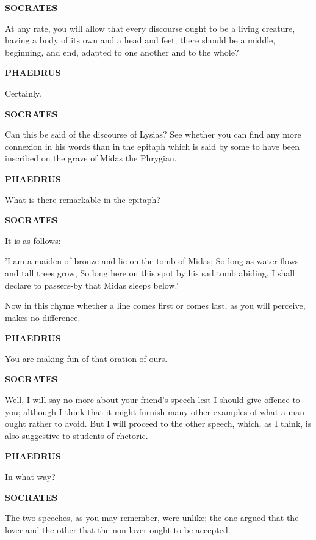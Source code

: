 \documentclass[11pt,letter]{article}
\begin{document}
\par \textbf{SOCRATES}
\par   At any rate, you will allow that every discourse ought to be a living creature, having a body of its own and a head and feet; there should be a middle, beginning, and end, adapted to one another and to the whole?

\par \textbf{PHAEDRUS}
\par   Certainly.

\par \textbf{SOCRATES}
\par   Can this be said of the discourse of Lysias? See whether you can find any more connexion in his words than in the epitaph which is said by some to have been inscribed on the grave of Midas the Phrygian.

\par \textbf{PHAEDRUS}
\par   What is there remarkable in the epitaph?

\par \textbf{SOCRATES}
\par   It is as follows: —

\par  'I am a maiden of bronze and lie on the tomb of Midas; So long as water flows and tall trees grow, So long here on this spot by his sad tomb abiding, I shall declare to passers-by that Midas sleeps below.'

\par  Now in this rhyme whether a line comes first or comes last, as you will perceive, makes no difference.

\par \textbf{PHAEDRUS}
\par   You are making fun of that oration of ours.

\par \textbf{SOCRATES}
\par   Well, I will say no more about your friend's speech lest I should give offence to you; although I think that it might furnish many other examples of what a man ought rather to avoid. But I will proceed to the other speech, which, as I think, is also suggestive to students of rhetoric.

\par \textbf{PHAEDRUS}
\par   In what way?

\par \textbf{SOCRATES}
\par   The two speeches, as you may remember, were unlike; the one argued that the lover and the other that the non-lover ought to be accepted.
\end{document}
